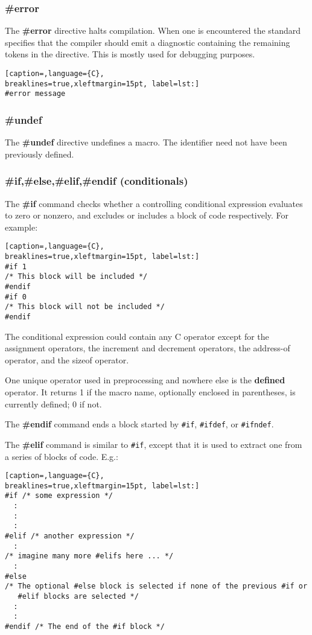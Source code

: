 \subsubsection{\#error}
The \textbf{\#error} directive halts compilation. When one is encountered the
standard specifies that the compiler should emit a diagnostic containing the
remaining tokens in the directive. This is mostly used for debugging purposes.
\lstset{basicstyle=\scriptsize, numbers=left, captionpos=b, tabsize=4}
\begin{lstlisting}[caption=,language={C},
breaklines=true,xleftmargin=15pt, label=lst:]
#error message
\end{lstlisting}

\subsubsection{\#undef}
The \textbf{\#undef} directive undefines a macro. The identifier need not have
been previously defined.

\subsubsection{\#if,\#else,\#elif,\#endif (conditionals)}
The \textbf{\#if} command checks whether a controlling conditional expression
evaluates to zero or nonzero, and excludes or includes a block of code
respectively. For example:
\lstset{basicstyle=\scriptsize, numbers=left, captionpos=b, tabsize=4}
\begin{lstlisting}[caption=,language={C},
breaklines=true,xleftmargin=15pt, label=lst:]
#if 1
/* This block will be included */
#endif
#if 0
/* This block will not be included */
#endif
\end{lstlisting}

The conditional expression could contain any C operator except for the
assignment operators, the increment and decrement operators, the address-of
operator, and the sizeof operator.

One unique operator used in preprocessing and nowhere else is the
\textbf{defined} operator. It returns 1 if the macro name, optionally enclosed
in parentheses, is currently defined; 0 if not.

The \textbf{\#endif} command ends a block started by \texttt{\#if},
\texttt{\#ifdef}, or \texttt{\#ifndef}.

The \textbf{\#elif} command is similar to \texttt{\#if}, except that it is used
to extract one from a series of blocks of code. E.g.:
\lstset{basicstyle=\scriptsize, numbers=left, captionpos=b, tabsize=4}
\begin{lstlisting}[caption=,language={C},
breaklines=true,xleftmargin=15pt, label=lst:]
#if /* some expression */
  :
  :
  :
#elif /* another expression */
  :
/* imagine many more #elifs here ... */
  :
#else
/* The optional #else block is selected if none of the previous #if or
   #elif blocks are selected */
  :
  :
#endif /* The end of the #if block */
\end{lstlisting}

